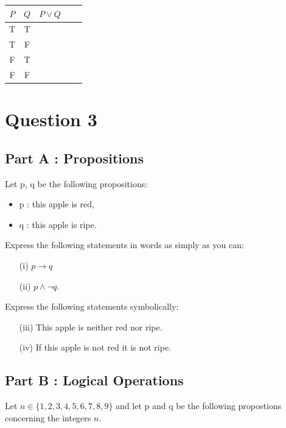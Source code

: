 \documentclass[]{report}
\begin{document}
\begin{tabular}{|c|c|c|c|c|}
\hline $P$ & $Q$ & $P \vee Q$ &  &  \\ \hline
\hline T & T &  &  &  \\ 
\hline T & F &  &  &  \\ 
\hline F & T &  &  &  \\ 
\hline \phantom{sp}F \phantom{sp} & \phantom{sp}F \phantom{sp} & \phantom{spacespa} & \phantom{spacespa}  & \phantom{spacespa} \\ 

\hline 
\end{tabular} 

\newpage



\section*{Question 3}
\subsection*{Part A : Propositions}
Let p, q be the following propositions:
\begin{itemize}
\item p : this apple is red, 
\item q : this apple is ripe.
\end{itemize}

\noindent Express the following statements in words as simply as you can:
\begin{itemize}
\item[(i)] $p \rightarrow q$
\item[(ii)] $p \wedge \neg q$.
\end{itemize}

\noindent Express the following statements symbolically:
\begin{itemize}
\item[(iii)] This apple is neither red nor ripe.
\item[(iv)] If this apple is not red it is not ripe.
\end{itemize}

\subsection*{Part B : Logical Operations}
Let $n \in \{1,2,3,4,5,6,7,8,9\}$ and let p and q be the following propostions concerning 
the integers $n$.
\end{document}
